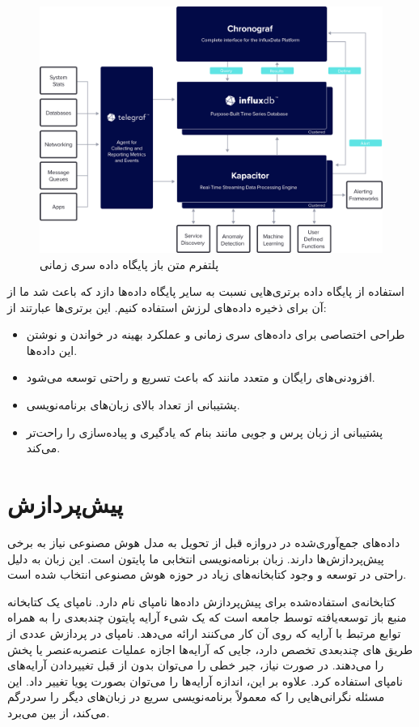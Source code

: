 \begin{figure}[!h]
\centering\includegraphics[scale=.11]{influx.png}
\caption{پلتفرم متن باز پایگاه داده سری زمانی  \cite{influx}}\label{fig:influx}
\end{figure}

استفاده از پایگاه داده  برتری‌هایی نسبت به سایر پایگاه داده‌ها دازد که باعث شد ما از آن برای ذخیره داده‌های لرزش استفاده کنیم. این برتری‌ها عبارتند از:

\begin{itemize}
\item طراحی اختصاصی برای داده‌های سری زمانی و عملکرد بهینه در خواندن و نوشتن این داده‌ها.
\item افزودنی‌های رایگان و متعدد مانند  که باعث تسریع و راحتی توسعه می‌شود.
\item پشتیبانی از تعداد بالای زبان‌های برنامه‌نویسی.
\item پشتیبانی از زبان پرس و جویی مانند  بنام  که یادگیری و پیاده‌سازی را راحت‌تر می‌کند.
\end{itemize}


\section{پیش‌پردازش}

داده‌های جمع‌آوری‌شده در دروازه قبل از تحویل به مدل هوش مصنوعی نیاز به برخی پیش‌پردازش‌ها دارند. زبان برنامه‌‌نویسی انتخابی ما پایتون است. این زبان به دلیل راحتی در توسعه و وجود کتابخانه‌های زیاد در حوزه هوش مصنوعی انتخاب شده است.


کتابخانه‌ی استفاده‌شده برای پیش‌پردازش داده‌ها نامپای نام دارد. نامپای یک کتابخانه منبع باز توسعه‌یافته توسط جامعه است که یک شیء آرایه پایتون چندبعدی را به همراه توابع مرتبط با آرایه که روی آن کار می‌کنند ارائه می‌دهد. نامپای در پردازش عددی از طریق های چندبعدی تخصص دارد، جایی که آرایه‌ها اجازه عملیات عنصربه‌عنصر یا پخش را می‌دهند. در صورت نیاز، جبر خطی را می‌توان بدون از قبل تغییردادن آرایه‌های نامپای استفاده کرد. علاوه بر این، اندازه آرایه‌ها را می‌توان بصورت پویا تغییر داد. این مسئله نگرانی‌هایی را که معمولاً برنامه‌نویسی سریع در زبان‌های دیگر را سردرگم می‌کند، از بین می‌برد\cite{bressert2012scipy,harris2020array}.

